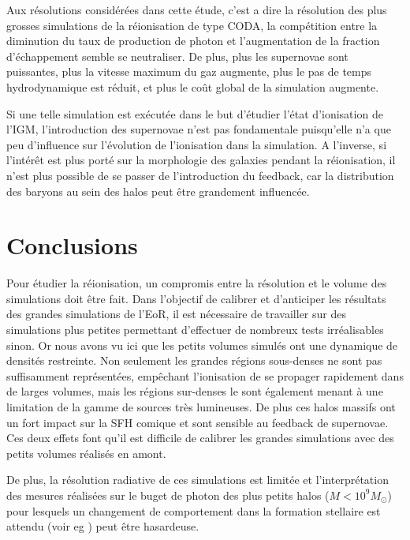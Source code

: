 Aux résolutions considérées dans cette étude, c'est a dire la résolution des plus grosses simulations de la réionisation de type CODA,  %
la compétition entre la diminution du taux de production de photon et l'augmentation de la fraction d'échappement semble se neutraliser.
De plus, plus les supernovae sont puissantes, plus la vitesse maximum du gaz augmente, plus le pas de temps hydrodynamique est réduit, et plus le coût global de la simulation augmente.

Si une telle simulation est exécutée dans le but d'étudier l'état d'ionisation de l'\ac{IGM}, l'introduction des supernovae n'est pas fondamentale puisqu'elle n'a que peu d'influence sur l'évolution de l'ionisation dans la simulation.
A l'inverse, si l’intérêt est plus porté sur la morphologie des galaxies pendant la réionisation, il n'est plus possible de se passer de l'introduction du feedback, car la distribution des baryons au sein des halos peut être grandement influencée.



\section{Conclusions}

Pour étudier la réionisation, un compromis entre la résolution et le volume des simulations doit être fait.
Dans l'objectif de calibrer et d'anticiper les résultats des grandes simulations de l'\ac{EoR}, il est nécessaire de travailler sur des simulations plus petites permettant d'effectuer de nombreux tests irréalisables sinon. 
Or nous avons vu ici que les petits volumes simulés ont une dynamique de densités restreinte. 
Non seulement les grandes régions sous-denses ne sont pas suffisamment représentées, empêchant l'ionisation de se propager rapidement dans de larges volumes, mais les régions sur-denses le sont également menant à une limitation de la gamme de sources très lumineuses.
De plus ces halos massifs ont un fort impact sur la \ac{SFH} comique et sont sensible au feedback de supernovae.
Ces deux effets font qu'il est difficile de calibrer les grandes simulations avec des petits volumes réalisés en amont.

De plus, la résolution radiative de ces simulations est limitée et l'interprétation des mesures réalisées sur le buget de photon des plus petits halos ($M < 10^9M_\odot$) pour lesquels un changement de comportement dans la formation stellaire est attendu (voir eg \cite{2001PhR...349..125B}) peut être hasardeuse.

